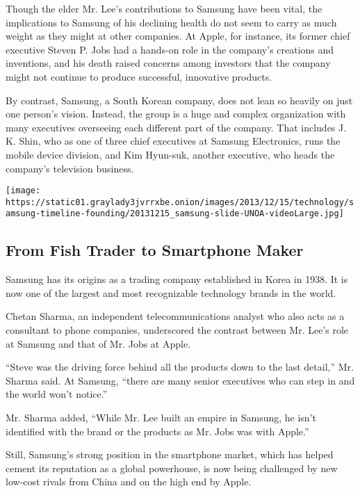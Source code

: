 Though the elder Mr. Lee's contributions to Samsung have been vital, the
implications to Samsung of his declining health do not seem to carry as
much weight as they might at other companies. At Apple, for instance,
its former chief executive Steven P. Jobs had a hands-on role in the
company's creations and inventions, and his death raised concerns among
investors that the company might not continue to produce successful,
innovative products.

By contrast, Samsung, a South Korean company, does not lean so heavily
on just one person's vision. Instead, the group is a huge and complex
organization with many executives overseeing each different part of the
company. That includes J. K. Shin, who as one of three chief executives
at Samsung Electronics, runs the mobile device division, and Kim
Hyun-suk, another executive, who heads the company's television
business.

\href{https://www.nytimes3xbfgragh.onion/interactive/2013/12/15/technology/samsung-timeline.html}{}

\texttt{[image: https://static01.graylady3jvrrxbe.onion/images/2013/12/15/technology/samsung-timeline-founding/20131215\_samsung-slide-UNOA-videoLarge.jpg]}

\hypertarget{from-fish-trader-to-smartphone-maker}{%
\subsection{From Fish Trader to Smartphone
Maker}\label{from-fish-trader-to-smartphone-maker}}

Samsung has its origins as a trading company established in Korea in
1938. It is now one of the largest and most recognizable technology
brands in the world.

Chetan Sharma, an independent telecommunications analyst who also acts
as a consultant to phone companies, underscored the contrast between Mr.
Lee's role at Samsung and that of Mr. Jobs at Apple.

``Steve was the driving force behind all the products down to the last
detail,'' Mr. Sharma said. At Samsung, ``there are many senior
executives who can step in and the world won't notice.''

Mr. Sharma added, ``While Mr. Lee built an empire in Samsung, he isn't
identified with the brand or the products as Mr. Jobs was with Apple.''

Still, Samsung's strong position in the smartphone market, which has
helped cement its reputation as a global powerhouse, is now being
challenged by new low-cost rivals from China and on the high end by
Apple.

